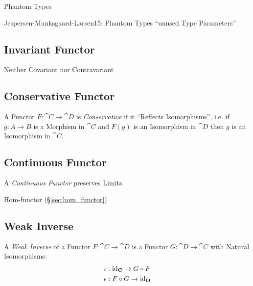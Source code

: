 Phantom Types %

Jespersen-Munksgaard-Larsen15: Phantom Types ``unused Type
Parameters''



\subsection{Invariant Functor} \label{sec:invariant_functor}

Neither Covariant nor Contravariant



\subsection{Conservative Functor}\label{sec:conservative_functor}

A Functor $F : \cat{C} \rightarrow \cat{D}$ is
\emph{Conservative} if it ``Reflects Isomorphisms'', i.e. if $g : A
\rightarrow B$ is a Morphism in $\cat{C}$ and $F(g)$ is an
Isomorphism in $\cat{D}$ then $g$ is an Isomorphism in
$\cat{C}$.



\subsection{Continuous Functor}\label{sec:continuous_functor}

A \emph{Continuous Functor} preserves Limits

Hom-functor (\S\ref{sec:hom_functor})



\subsection{Weak Inverse}\label{sec:weak_inverse}

A \emph{Weak Inverse} of a Functor $F : \cat{C} \rightarrow \cat{D}$
is a Functor $G : \cat{D} \rightarrow \cat{C}$ with Natural
Isomorphisms:
\begin{align*}
  \iota &: \mathrm{id}_\mathbf{C} \rightarrow G \circ F \\
  \epsilon &: F \circ G \rightarrow \mathrm{id}_\mathbf{D}
\end{align*}

